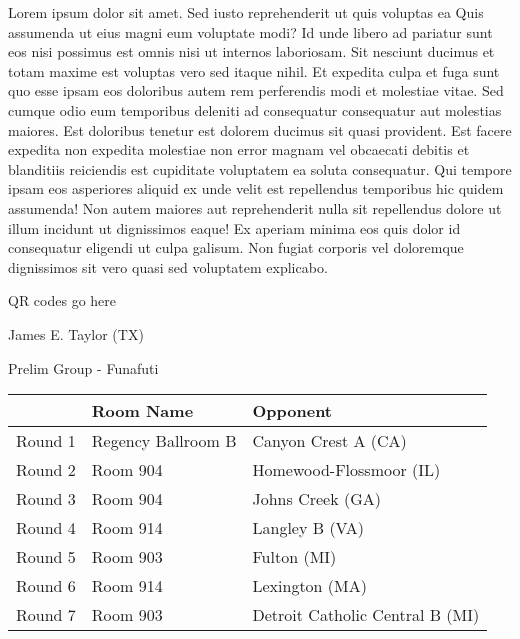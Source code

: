 \documentclass{article}%
\begin{document}
\vspace*{8pt}%
\linebreak%
\newline%
\newline%
Lorem ipsum dolor sit amet. Sed iusto reprehenderit ut quis voluptas ea Quis assumenda ut eius magni eum voluptate modi? Id unde libero ad pariatur sunt eos nisi possimus est omnis nisi ut internos laboriosam. Sit nesciunt ducimus et totam maxime est voluptas vero sed itaque nihil. Et expedita culpa et fuga sunt quo esse ipsam eos doloribus autem rem perferendis modi et molestiae vitae.\newline%
\newline%
Sed cumque odio eum temporibus deleniti ad consequatur consequatur aut molestias maiores. Est doloribus tenetur est dolorem ducimus sit quasi provident. Est facere expedita non expedita molestiae non error magnam vel obcaecati debitis et blanditiis reiciendis est cupiditate voluptatem ea soluta consequatur. Qui tempore ipsam eos asperiores aliquid ex unde velit est repellendus temporibus hic quidem assumenda!\newline%
\newline%
Non autem maiores aut reprehenderit nulla sit repellendus dolore ut illum incidunt ut dignissimos eaque! Ex aperiam minima eos quis dolor id consequatur eligendi ut culpa galisum. Non fugiat corporis vel doloremque dignissimos sit vero quasi sed voluptatem explicabo.\newline%
\newline%
%
\vspace*{30pt}%
\begin{center}%
\begin{Huge}%
QR codes go here%
\end{Huge}%
\end{center}%
\newpage%
%
\begin{center}%
\begin{Huge}%
James E. Taylor (TX)%
\end{Huge}%
\vspace*{8pt}%
\linebreak%
\begin{Large}%
Prelim Group {-} Funafuti%
\end{Large}%
\end{center}%
\begin{tabularx}{\textwidth}{|c|Y|Y|}%
\hline%
&Room Name&Opponent\\%
\hline%
Round 1&Regency Ballroom B&Canyon Crest A (CA)\\%
Round 2&Room 904&Homewood{-}Flossmoor (IL)\\%
Round 3&Room 904&Johns Creek (GA)\\%
Round 4&Room 914&Langley B (VA)\\%
Round 5&Room 903&Fulton (MI)\\%
Round 6&Room 914&Lexington (MA)\\%
Round 7&Room 903&Detroit Catholic Central B (MI)\\%
\hline%
\end{tabularx}%
\end{document}
